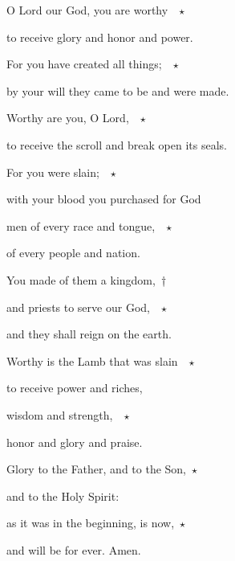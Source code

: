 \noindent O Lord our God, you are worthy ~$\star$~\nopagebreak

to receive glory and honor and power.

\noindent For you have created all things; ~$\star$~\nopagebreak

by your will they came to be and were made.

\noindent Worthy are you, O Lord, ~$\star$~\nopagebreak

to receive the scroll and break open its seals.

\noindent For you were slain; ~$\star$~\nopagebreak

with your blood you purchased for God

\noindent men of every race and tongue, ~$\star$~\nopagebreak

of every people and nation.

\noindent You made of them a kingdom,~†~\nopagebreak

and priests to serve our God, ~$\star$~\nopagebreak

and they shall reign on the earth.

\noindent Worthy is the Lamb that was slain ~$\star$~\nopagebreak

to receive power and riches,

\noindent wisdom and strength, ~$\star$~\nopagebreak

honor and glory and praise.

\noindent Glory to the Father, and to the Son,~$\star$~\nopagebreak

and to the Holy Spirit:

\noindent as it was in the beginning, is now,~$\star$~\nopagebreak

and will be for ever. Amen.
